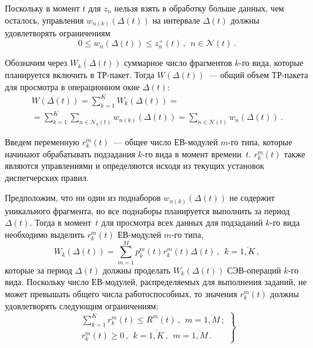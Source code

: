 \begin{multicols}{2}
Поскольку в момент $t$ для $z_n$ нельзя взять в обработку больше
данных, чем осталось, управления $w_{n(k)}(\Delta(t))$ на интервале
$\Delta(t)$ должны удовлетворять ограничениям
\begin{equation}
0 \le w_{n}(\Delta(t)) \le  z^+_{n}(t)\,,  \ \ n \in \mathcal{N}(t)\,. 
\label{e1-mal}
\end{equation}

Обозначим через $W_{k} (\Delta(t))$ суммарное чис\-ло фрагментов
$k$-го вида, которые планируется включить в ТР-па\-кет. Тогда
$W (\Delta(t))$~--- общий объем ТР-па\-ке\-та  для просмотра в операционном окне $\Delta(t)$:
\begin{multline}
W (\Delta(t)) = \sum\limits_{k = 1}^K W_{k}(\Delta(t)) =  {}\\
{}=
\sum\limits_{k = 1}^K \sum\limits_{n \in \mathcal{N}_k(t)} w_{n(k)}(\Delta(t)) =  
\sum\limits_{n \in \mathcal{N}(t)} w_{n}(\Delta(t))\,.
\label{e2-mal}
\end{multline}


Введем переменную $r_{k}^m(t)$~--- общее число  ЕВ-мо\-ду\-лей  $m$-го
типа, которые начинают обрабатывать подзадания  $k$-го вида в момент
времени~$t$. $r_{k}^m(t)$ также являются управ\-ле\-ни\-ями  и
определяются исходя из   текущих установок диспетчерских правил.

Предположим, что ни один из поднаборов $w_{n(k)}(\Delta(t))$ не 
содержит уникального фрагмента, но все поднаборы планируется  
выполнить за  период $ \Delta(t)$.  Тогда в момент~$t$ для просмотра всех данных 
для подзаданий $k$-го вида необходимо выделить  $r_{k}^m(t)$  ЕВ-мо\-ду\-лей $m$-го типа,
\begin{equation}
W_{k} (\Delta(t)) = \sum\limits^M_{m = 1} p_{k}^m (t)  r_{k}^m (t)  \Delta(t)\,, 
\ \ k = \overline{1,K}\,, 
\label{e3-mal}
\end{equation}
которые за период $\Delta(t)$ должны  проделать $W_{k}(\Delta(t))$   СЭВ-опе\-ра\-ций $k$-го вида.
Поскольку число ЕВ-модулей, распределяемых для выполнения заданий, не может превышать 
общего числа работоспособных, то
значения $r_{k}^m(t)$ должны удовлетворять следующим ограничениям:
\begin{equation}
\left.  
\begin{array}{c}
\displaystyle\sum\limits_{k=1}^K r_{k}^m(t) \le R^m(t)\,, \ \ m = \overline{1,M}\,;\\[9pt]
r_{k}^m (t) \ge 0\,, \ \ k = \overline{1,K}\,, \ \ m = \overline{1,M}\,.
                    \end{array}
                    \right \} 
                    \label{e4-mal}
                    \end{equation}


\end{multicols}
